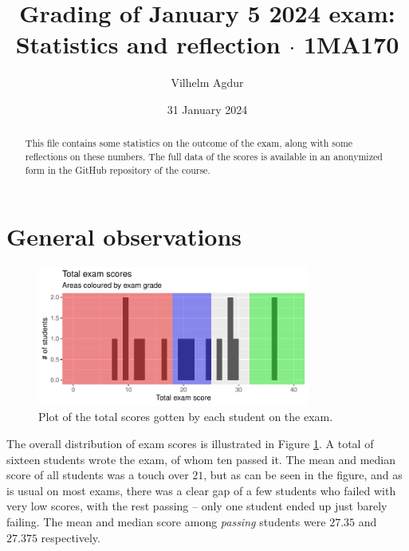 \documentclass[nobib]{tufte-handout}
\title{Grading of January 5 2024 exam: Statistics and reflection $\cdot$ 1MA170}
\author[Vilhelm Agdur]{Vilhelm Agdur}
\date{31 January 2024}
\begin{document}
\maketitle%

\begin{abstract}
\noindent
This file contains some statistics on the outcome of the exam, along with some reflections on these numbers. The full data of the scores is available in an anonymized form in the GitHub repository of the course.
\end{abstract}

\section{General observations}

\begin{figure}
  \centering
  \includegraphics[width = 0.8\textwidth]{totalscore.pdf}
  \caption[Total score figure]{Plot of the total scores gotten by each student on the exam.}
  \label{fig:total_scores}
\end{figure}

The overall distribution of exam scores is illustrated in Figure \ref{fig:total_scores}. A total of sixteen students wrote the exam, of whom ten passed it. The mean and median score of all students was a touch over $21$, but as can be seen in the figure, and as is usual on most exams, there was a clear gap of a few students who failed with very low scores, with the rest passing -- only one student ended up just barely failing. The mean and median score among \emph{passing} students were $27.35$ and $27.375$ respectively.
\end{document}
